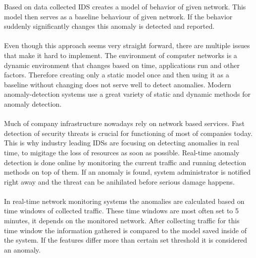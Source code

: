 \documentclass[thesis=B,english]{FITthesis}[2012/10/20]
\begin{document}
Based on data collected IDS creates a model of behavior of given network.
This model then serves as a baseline behaviour of given network.
If the behavior suddenly significantly changes this anomaly is detected and reported.
\\ \\ %
Even though this approach seems very straight forward, there are multiple issues that make it hard to implement.
The environment of computer networks is a dynamic environment that changes based on time, applications run and other factors.
Therefore creating only a static model once and then using it as a baseline without changing does not serve well to detect anomalies.
Modern anomaly-detection systems use a great variety of static and dynamic methods for anomaly detection.
\\ \\
Much of company infrastructure nowadays rely on network based services. %
Fast detection of security threats is crucial for functioning of most of companies today.
This is why industry leading IDSs are focusing on detecting anomalies in real time, to migitage the loss of resources as soon as possible.
Real-time anomaly detection is done online by monitoring the current traffic and running detection methods on top of them.
If an anomaly is found, system administrator is notified right away and the threat can be anihilated before serious damage happens.
\\ \\
In real-time network monitoring systems the anomalies are calculated based on time windows of collected traffic.
These time windows are most often set to 5 minutes, it depends on the monitored network.
After collecting traffic for this time window the information gathered is compared to the model saved inside of the system. If the features differ more than certain set threshold it is considered an anomaly.
\end{document}
